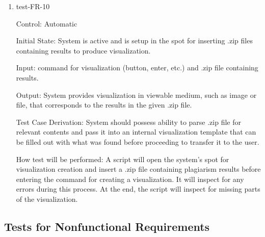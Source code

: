 \documentclass[12pt, titlepage]{article}
\begin{document}
\begin{enumerate}

\item{test-FR-10\\}

Control: Automatic
					
Initial State: System is active and is setup in the spot for inserting .zip 
files containing results to produce visualization.
					
Input: command for visualization (button, enter, etc.) and .zip file containing 
results.
					
Output: System provides visualization in viewable medium, such as image or file,
that corresponds to the results in the given .zip file.

Test Case Derivation: System should possess ability to parse .zip file for 
relevant contents and pass it into an internal visualization template that 
can be filled out with what was found before proceeding to transfer it to
the user.

How test will be performed: A script will open the system's spot for 
visualization creation and insert a .zip file containing plagiarism results 
before entering the command for creating a visualization. It will inspect for 
any errors during this process. At the end, the script will inspect for 
missing parts of the visualization.
\end{enumerate}

\subsection{Tests for Nonfunctional Requirements}



\end{document}
